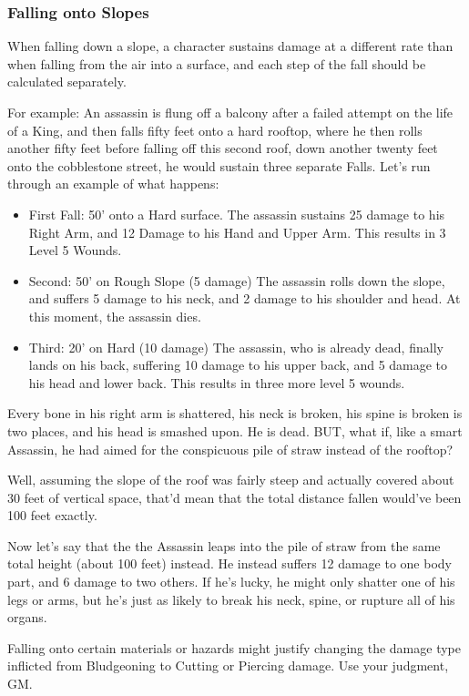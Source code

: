 \documentclass[oneside,11pt,english]{book}
\begin{document}
\subsubsection{Falling onto Slopes}
When falling down a slope, a character sustains damage at a different rate than when falling from the air 
into a surface, and each step of the fall should be calculated separately.

For example: An assassin is flung off a balcony after a failed attempt on the life of a King, and then falls 
fifty feet onto a hard rooftop, where he then rolls another fifty feet before falling off this second roof, 
down another twenty feet onto the cobblestone street, he would sustain three separate Falls. Let’s run 
through an example of what happens: 
\begin{itemize}
\item First Fall: 50’ onto a Hard surface. The assassin sustains 25 damage to his Right Arm, and 12 
Damage to his Hand and Upper Arm. This results in 3 Level 5 Wounds. 
\item Second: 50’ on Rough Slope (5 damage) The assassin rolls down the slope, and suffers 5 damage 
to his neck, and 2 damage to his shoulder and head. At this moment, the assassin dies. 
\item Third: 20’ on Hard (10 damage) The assassin, who is already dead, finally lands on his back, 
suffering 10 damage to his upper back, and 5 damage to his head and lower back. This results in 
three more level 5 wounds. 
\end{itemize}

Every bone in his right arm is shattered, his neck is broken, his spine is broken is two places, and his head 
is smashed upon. He is dead. BUT, what if, like a smart Assassin, he had aimed for the conspicuous pile 
of straw instead of the rooftop? 

Well, assuming the slope of the roof was fairly steep and actually covered about 30 feet of vertical space, 
that’d mean that the total distance fallen would’ve been 100 feet exactly. 

Now let’s say that the the Assassin leaps into the pile of straw from the same total height (about 100 feet) 
instead. He instead suffers 12 damage to one body part, and 6 damage to two others. If he’s lucky, he 
might only shatter one of his legs or arms, but he’s just as likely to break his neck, spine, or rupture all of 
his organs.

Falling onto certain materials or hazards might justify changing the damage type inflicted from Bludgeoning to Cutting or Piercing damage. Use your judgment, GM.
\end{document}

